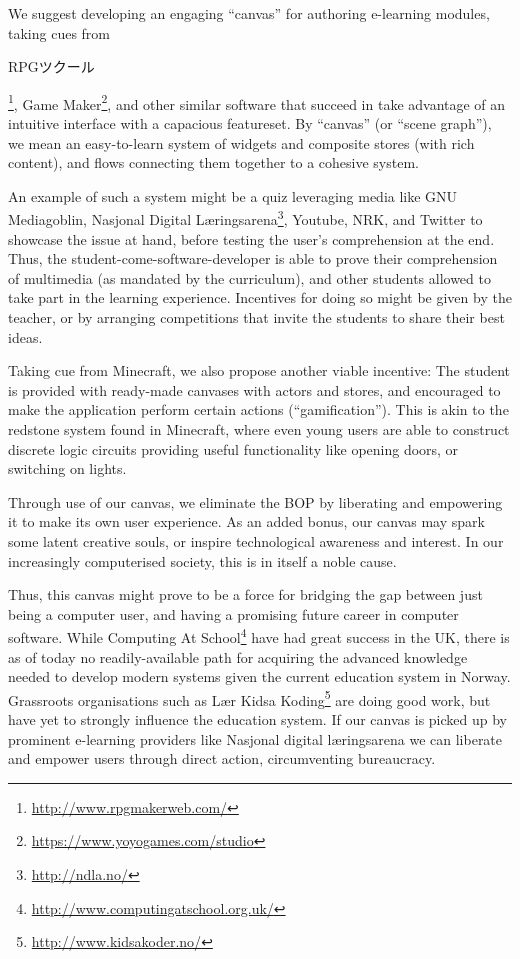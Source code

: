 We suggest developing an engaging ``canvas''  for authoring e-learning 
modules, taking cues from 
\begin{CJK}{UTF8}{min}RPGツクール\end{CJK}\footnote{\url{http://www.rpgmakerweb.com/}}, 
Game Maker\footnote{\url{https://www.yoyogames.com/studio}}, and other similar 
software that succeed in take advantage of an intuitive interface with a 
capacious featureset. By ``canvas'' (or ``scene graph''), we mean an 
easy-to-learn system of widgets and composite stores (with rich content), and 
flows connecting them together to a cohesive system. 

An example of such a system might be a quiz leveraging media like GNU 
Mediagoblin, Nasjonal Digital Læringsarena\footnote{\url{http://ndla.no/}}, 
Youtube, NRK, and Twitter to showcase the issue at hand, before testing the 
user's comprehension at the end. Thus, the student-come-software-developer is 
able to prove their comprehension of multimedia (as mandated by the 
curriculum), and other students allowed to take part in the learning 
experience. Incentives for doing so might be given by the teacher, or by 
arranging competitions that invite the students to share their best ideas.

Taking cue from Minecraft, we also propose another viable incentive: The 
student is provided with ready-made canvases with actors and stores, and 
encouraged to make the application perform certain actions (``gamification''). 
This is akin to the redstone system found in Minecraft, where even young users 
are able to construct discrete logic circuits providing useful functionality 
like opening doors, or switching on lights\cite{brand2013crafting}.

Through use of our canvas, we eliminate the BOP by liberating and empowering 
it to make its own user experience. As an added bonus, our canvas may spark 
some latent creative souls, or inspire technological awareness and interest. 
In our increasingly computerised society, this is in itself a noble cause. 

Thus, this canvas might prove to be a force for bridging the gap between just 
being a computer user, and having a promising future career in computer 
software. While Computing At 
School\footnote{\url{http://www.computingatschool.org.uk/}} have had great 
success in the UK, there is as of today no readily-available path for 
acquiring the advanced knowledge needed to develop modern systems given the 
current education system in Norway. Grassroots organisations such as Lær Kidsa 
Koding\footnote{\url{http://www.kidsakoder.no/}} are doing good work, but have 
yet to strongly influence the education system. If our canvas is picked up by 
prominent e-learning providers like Nasjonal digital læringsarena we can 
liberate and empower users through direct action, circumventing bureaucracy.


